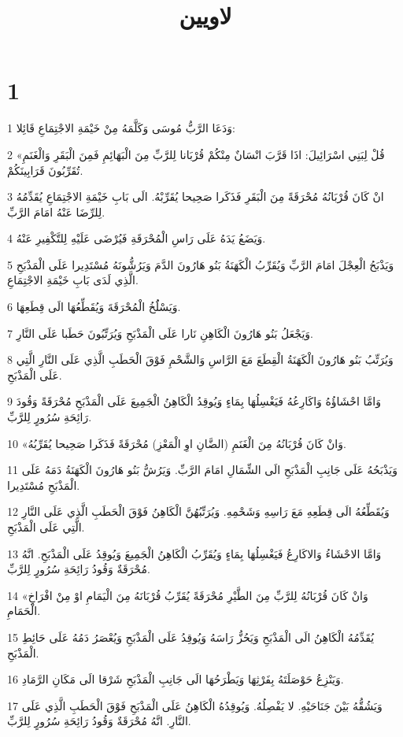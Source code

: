 

\title{لاويين}


\chapter{1}

\par 1 وَدَعَا الرَّبُّ مُوسَى وَكَلَّمَهُ مِنْ خَيْمَةِ الاجْتِمَاعِ قَائِلا:
\par 2 «قُلْ لِبَنِي اسْرَائِيلَ: اذَا قَرَّبَ انْسَانٌ مِنْكُمْ قُرْبَانا لِلرَّبِّ مِنَ الْبَهَائِمِ فَمِنَ الْبَقَرِ وَالْغَنَمِ تُقَرِّبُونَ قَرَابِينَكُمْ.
\par 3 انْ كَانَ قُرْبَانُهُ مُحْرَقَةً مِنَ الْبَقَرِ فَذَكَرا صَحِيحا يُقَرِّبْهُ. الَى بَابِ خَيْمَةِ الاجْتِمَاعِ يُقَدِّمُهُ لِلرِّضَا عَنْهُ امَامَ الرَّبِّ.
\par 4 وَيَضَعُ يَدَهُ عَلَى رَاسِ الْمُحْرَقَةِ فَيُرْضَى عَلَيْهِ لِلتَّكْفِيرِ عَنْهُ.
\par 5 وَيَذْبَحُ الْعِجْلَ امَامَ الرَّبِّ وَيُقَرِّبُ الْكَهَنَةُ بَنُو هَارُونَ الدَّمَ وَيَرُشُّونَهُ مُسْتَدِيرا عَلَى الْمَذْبَحِ الَّذِي لَدَى بَابِ خَيْمَةِ الاجْتِمَاعِ.
\par 6 وَيَسْلَُخُ الْمُحْرَقَةَ وَيُقَطِّعُهَا الَى قِطَعِهَا.
\par 7 وَيَجْعَلُ بَنُو هَارُونَ الْكَاهِنِ نَارا عَلَى الْمَذْبَحِ وَيُرَتِّبُونَ حَطَبا عَلَى النَّارِ.
\par 8 وَيُرَتِّبُ بَنُو هَارُونَ الْكَهَنَةُ الْقِطَعَ مَعَ الرَّاسِ وَالشَّحْمِ فَوْقَ الْحَطَبِ الَّذِي عَلَى النَّارِ الَّتِي عَلَى الْمَذْبَحِ.
\par 9 وَامَّا احْشَاؤُهُ وَاكَارِعُهُ فَيَغْسِلُهَا بِمَاءٍ وَيُوقِدُ الْكَاهِنُ الْجَمِيعَ عَلَى الْمَذْبَحِ مُحْرَقَةً وَقُودَ رَائِحَةِ سُرُورٍ لِلرَّبِّ.
\par 10 «وَانْ كَانَ قُرْبَانُهُ مِنَ الْغَنَمِ (الضَّانِ اوِ الْمَعْزِ) مُحْرَقَةً فَذَكَرا صَحِيحا يُقَرِّبُهُ.
\par 11 وَيَذْبَحُهُ عَلَى جَانِبِ الْمَذْبَحِ الَى الشِّمَالِ امَامَ الرَّبِّ. وَيَرُشُّ بَنُو هَارُونَ الْكَهَنَةُ دَمَهُ عَلَى الْمَذْبَحِ مُسْتَدِيرا.
\par 12 وَيُقَطِّعُهُ الَى قِطَعِهِ مَعَ رَاسِهِ وَشَحْمِهِ. وَيُرَتِّبُهُنَّ الْكَاهِنُ فَوْقَ الْحَطَبِ الَّذِي عَلَى النَّارِ الَّتِي عَلَى الْمَذْبَحِ.
\par 13 وَامَّا الاحْشَاءُ وَالاكَارِعُ فَيَغْسِلُهَا بِمَاءٍ وَيُقَرِّبُ الْكَاهِنُ الْجَمِيعَ وَيُوقِدُ عَلَى الْمَذْبَحِ. انَّهُ مُحْرَقَةٌ وَقُودُ رَائِحَةِ سُرُورٍ لِلرَّبِّ.
\par 14 «وَانْ كَانَ قُرْبَانُهُ لِلرَّبِّ مِنَ الطَّيْرِ مُحْرَقَةً يُقَرِّبُ قُرْبَانَهُ مِنَ الْيَمَامِ اوْ مِنْ افْرَاخِ الْحَمَامِ.
\par 15 يُقَدِّمُهُ الْكَاهِنُ الَى الْمَذْبَحِ وَيَحُزُّ رَاسَهُ وَيُوقِدُ عَلَى الْمَذْبَحِ وَيُعْصَرُ دَمُهُ عَلَى حَائِطِ الْمَذْبَحِ.
\par 16 وَيَنْزِعُ حَوْصَلَتَهُ بِفَرْثِهَا وَيَطْرَحُهَا الَى جَانِبِ الْمَذْبَحِ شَرْقا الَى مَكَانِ الرَّمَادِ.
\par 17 وَيَشُقُّهُ بَيْنَ جَنَاحَيْهِ. لا يَفْصِلُهُ. وَيُوقِدُهُ الْكَاهِنُ عَلَى الْمَذْبَحِ فَوْقَ الْحَطَبِ الَّذِي عَلَى النَّارِ. انَّهُ مُحْرَقَةٌ وَقُودُ رَائِحَةِ سُرُورٍ لِلرَّبِّ.

